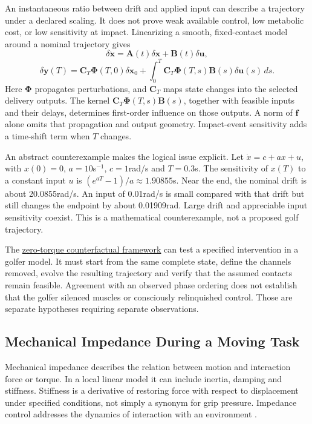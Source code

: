 An instantaneous ratio between drift and applied input can describe a trajectory under a declared scaling. It does not prove weak available control, low metabolic cost, or low sensitivity at impact. Linearizing a smooth, fixed-contact model around a nominal trajectory gives
\[
\delta\dot{\bm x}=\bm A(t)\delta\bm x+\bm B(t)\delta\bm u,
\]
\[
\delta\bm y(T)=\bm C_T\bm\Phi(T,0)\delta\bm x_0+
\int_0^T\bm C_T\bm\Phi(T,s)\bm B(s)\delta\bm u(s)\,ds.
\]
Here $\bm\Phi$ propagates perturbations, and $\bm C_T$ maps state changes into the selected delivery outputs. The kernel $\bm C_T\bm\Phi(T,s)\bm B(s)$, together with feasible inputs and their delays, determines first-order influence on those outputs. A norm of $\bm f$ alone omits that propagation and output geometry. Impact-event sensitivity adds a time-shift term when $T$ changes.

An abstract counterexample makes the logical issue explicit. Let $\dot x=c+ax+u$, with $x(0)=0$, $a=10$s$^{-1}$, $c=1$rad/s and $T=0.3$s. The sensitivity of $x(T)$ to a constant input $u$ is $(e^{aT}-1)/a\approx1.90855$s. Near the end, the nominal drift is about 20.0855rad/s. An input of 0.01rad/s is small compared with that drift but still changes the endpoint by about 0.01909rad. Large drift and appreciable input sensitivity coexist. This is a mathematical counterexample, not a proposed golf trajectory.

The \hyperref[ch:zero_torque_counterfactual]{zero-torque counterfactual framework} can test a specified intervention in a golfer model. It must start from the same complete state, define the channels removed, evolve the resulting trajectory and verify that the assumed contacts remain feasible. Agreement with an observed phase ordering does not establish that the golfer silenced muscles or consciously relinquished control. Those are separate hypotheses requiring separate observations.

\subsection{Mechanical Impedance During a Moving Task}
\label{subsec:ch26_impedance}

Mechanical impedance describes the relation between motion and interaction force or torque. In a local linear model it can include inertia, damping and stiffness. Stiffness is a derivative of restoring force with respect to displacement under specified conditions, not simply a synonym for grip pressure. Impedance control addresses the dynamics of interaction with an environment \citep{hogan1985impedance}.

